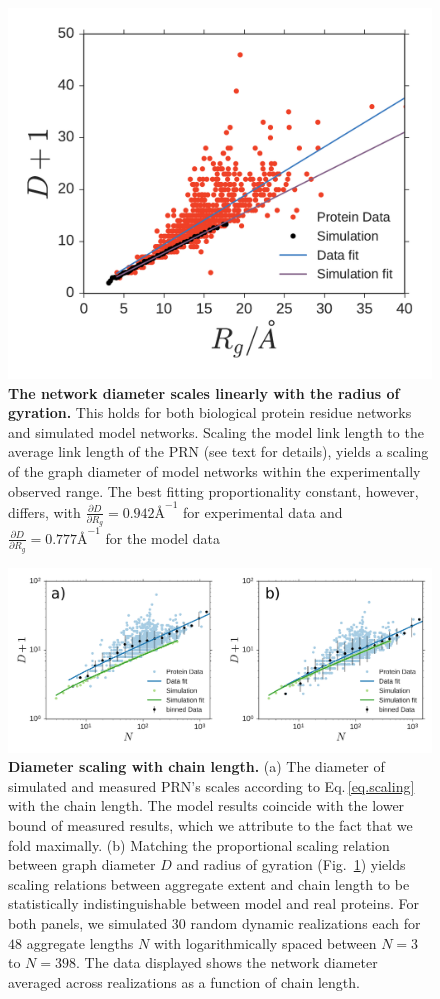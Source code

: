 \documentclass[9pt]{elife}
\begin{document}
\begin{figure}[h]
        \centering
	\includegraphics[width=0.8 \columnwidth]{simRGD}
        \caption{\textbf{The network diameter scales linearly with the radius of gyration.} This holds for both biological protein residue networks and simulated model networks. Scaling the model link length to the average link length of the PRN (see text for details), yields a scaling of the graph diameter of model networks within the experimentally observed range. The best fitting proportionality constant, however, differs, with $\tfrac{\partial D}{\partial R_g} = 0.942 \textrm{\AA}^{-1}$  for experimental data and $\tfrac{\partial D}{\partial R_g} = 0.777 \textrm{\AA}^{-1}$ for the model data} 
        \label{fig.rgd}
\end{figure}

\begin{figure}[h]
        \centering
	\includegraphics[width=\columnwidth]{Dscaling}
        \caption{\textbf{Diameter scaling with chain length.} (a) The diameter of simulated and measured PRN's scales according to Eq.\,\ref{eq.scaling} with the chain length. The model results coincide with the lower bound of measured results, which we attribute to the fact that we fold maximally.
        (b) Matching the proportional scaling relation between graph diameter $D$ and radius of gyration (Fig.~\ref{fig.rgd}) yields scaling relations between aggregate extent and chain length to be statistically indistinguishable between model and real proteins. For both panels, we simulated 30 random dynamic realizations each for $48$ aggregate lengths $N$ with logarithmically spaced between $N = 3 $ to $N = 398$. The data displayed shows the network diameter averaged across realizations as a function of chain length.
        }
        \label{fig.sca}
\end{figure}
\end{document}

